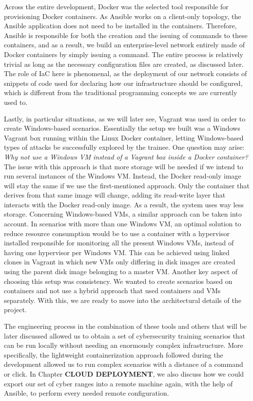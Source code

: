 Across the entire development, Docker was the selected tool responsible for provisioning Docker containers. As Ansible works on a client-only topology, the Ansible application does not need to be installed in the containers. Therefore, Ansible is responsible for both the creation and the issuing of commands to these containers, and as a result, we build an enterprise-level network entirely made of Docker containers by simply issuing a command. The entire process is relatively trivial as long as the necessary configuration files are created, as discussed later. The role of IaC here is phenomenal, as the deployment of our network consists of snippets of code used for declaring how our infrastructure should be configured, which is different from the traditional programming concepts we are currently used to.

Lastly, in particular situations, as we will later see, Vagrant was used in order to create Windows-based scenarios. Essentially the setup we built was a Windows Vagrant box running within the Linux Docker container, letting Windows-based types of attacks be successfully explored by the trainee. One question may arise: \textit{Why not use a Windows VM instead of a Vagrant box inside a Docker container?} The issue with this approach is that more storage will be needed if we intend to run several instances of the Windows VM. Instead, the Docker read-only image will stay the same if we use the first-mentioned approach.
Only the container that derives from that same image will change, adding its read-write layer that interacts with the Docker read-only image. As a result, the system uses way less storage. Concerning Windows-based VMs, a similar approach can be taken into account. In scenarios with more than one Windows VM, an optimal solution to reduce resource consumption would be to use a container with a hypervisor installed responsible for monitoring all the present Windows VMs, instead of having one hypervisor per Windows VM. This can be achieved using linked clones in Vagrant in which new VMs only differing in disk images are created using the parent disk image belonging to a master VM. Another key aspect of choosing this setup was consistency. We wanted to create scenarios based on containers and not use a hybrid approach that used containers and VMs separately. With this, we are ready to move into the architectural details of the project.

The engineering process in the combination of these tools and others that will be later discussed allowed us to obtain a set of cybersecurity training scenarios that can be run locally without needing an enormously complex infrastructure. More specifically, the lightweight containerization approach followed during the development allowed us to run complex scenarios with a distance of a command or click. In Chapter \textbf{CLOUD DEPLOYMENT}, we also discuss how we could export our set of cyber ranges into a remote machine again, with the help of Ansible, to perform every needed remote configuration.

